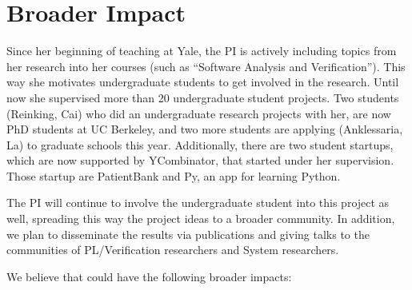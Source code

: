 
\section{Broader Impact}

Since her beginning of teaching at Yale, the PI is actively including topics from her 
research into her courses (such as ``Software Analysis and Verification''). This way
she motivates undergraduate students to get involved in the research. Until now 
she supervised more than 20 undergraduate student projects. Two students (Reinking, Cai) 
who did an undergraduate research projects with her, are now PhD students at 
UC Berkeley, and two more students are applying (Anklessaria, La) to graduate schools 
this year. Additionally, there are two student startups, which are now supported
by YCombinator, that started under her supervision. Those startup are PatientBank
and Py, an app for learning Python.

The PI will continue to involve the undergraduate student into 
this project as well, spreading this way the project ideas to a broader community.
In addition, we plan to disseminate the results via publications and giving talks 
to the communities of PL/Verification researchers and System researchers.

We believe that \app could have the following broader impacts:

